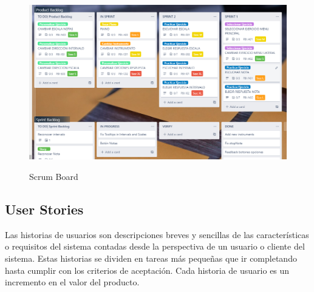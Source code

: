 \documentclass[12pt,twoside,titlepage]{report}
\begin{document}
\begin{figure}[H]
    \centering
    \includegraphics[scale=0.47]{Scrum/ScrumBoard}
    \label{fig:ScrumBoard}
    \caption{Scrum Board}
\end{figure}

\subsection{User Stories}

Las historias de usuarios son descripciones breves y sencillas de las características o requisitos del sistema contadas desde la perspectiva de un usuario o cliente del sistema. Estas historias se dividen en tareas más pequeñas que ir completando hasta cumplir con los criterios de aceptación. Cada historia de usuario es un incremento en el valor del producto.
\end{document}
